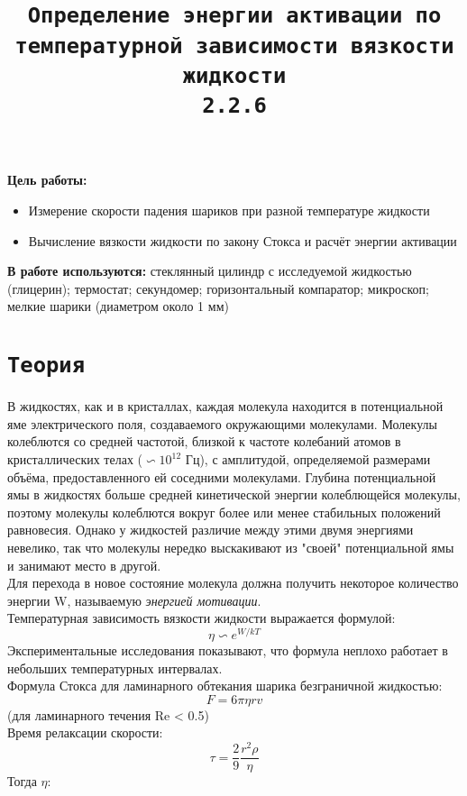 \documentclass[11pt,a4paper]{article}
\title{\texttt{Определение энергии активации
по температурной зависимости вязкости
жидкости \\ 2.2.6}}
\author{}
\date{}
\begin{document}
  \maketitle

\textbf{Цель работы:}
\begin{itemize}
  \item  Измерение скорости падения шариков при разной
  температуре жидкости
  \item Вычисление вязкости жидкости по закону
  Стокса и расчёт энергии активации
\end{itemize}

\textbf{В работе используются:}  стеклянный цилиндр с исследуемой
 жидкостью (глицерин); термостат; секундомер; горизонтальный компаратор; 
 микроскоп; мелкие шарики (диаметром около 1 мм)

\section*{\texttt{Теория}}
В жидкостях, как и в кристаллах, каждая
молекула находится в потенциальной яме электрического поля, 
создаваемого окружающими молекулами. Молекулы колеблются со средней
частотой, близкой к частоте колебаний атомов в кристаллических телах
($\backsim 10^{12}$ Гц), с амплитудой, определяемой размерами объёма, 
предоставленного ей соседними молекулами. Глубина потенциальной ямы в
жидкостях больше средней кинетической энергии колеблющейся 
молекулы, поэтому молекулы колеблются вокруг более или 
менее стабильных положений равновесия. Однако у жидкостей различие 
между этими двумя энергиями невелико, так что молекулы нередко выскакивают из
"своей" потенциальной ямы и занимают место в другой.\\
Для перехода в новое состояние молекула должна получить
некоторое количество энергии W, называемую \textit{энергией мотивации}.\\
Температурная зависимость вязкости жидкости 
выражается формулой: \[\eta \backsim e^{W/kT}\]
Экспериментальные исследования показывают, что формула
неплохо работает в небольших температурных интервалах.\\
Формула Стокса для ламинарного обтекания шарика безграничной жидкостью:
\[F = 6\pi\eta rv \]
(для ламинарного течения Re < 0.5)\\
Время релаксации скорости:
\[\tau = \frac{2}{9} \frac{r^2\rho}{\eta}\]
Тогда $\eta$:

\begin{center}
\end{center}
\end{document}
